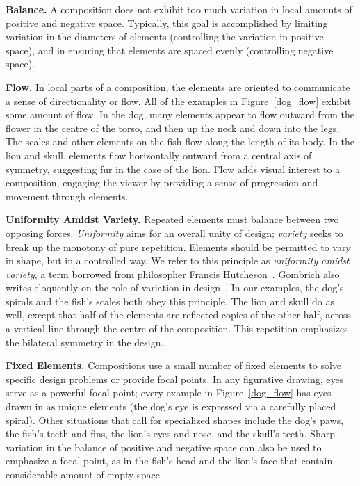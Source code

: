 \begin{items}%
\item \textbf{Balance.} A composition does not exhibit too
  much variation in local amounts of positive and negative space.
  Typically, this goal is accomplished by limiting variation in 
  the diameters of elements (controlling the variation in
  positive space), and in ensuring that elements are spaced 
  evenly (controlling negative space).

\item \textbf{Flow.} In local parts of a composition, the elements
  are oriented to communicate a sense of directionality or flow.
  All of the examples in Figure~\ref{dog_flow} exhibit 
  some amount of flow.  In the dog, many elements appear to flow
  outward from the flower in the centre of the torso, and then
  up the neck and down into the legs.  The scales and other elements
  on the fish flow along the length of its body.  In the lion and skull,
  elements flow horizontally outward from a central axis of symmetry,
  suggesting fur in the case of the lion.  Flow
  adds visual interest to a composition, engaging the viewer 
  by providing a sense of progression and movement through elements.

\item \textbf{Uniformity Amidst Variety.} Repeated elements must balance
  between two opposing forces.  \textit{Uniformity} 
  aims for an overall unity of design; \textit{variety}
  seeks to break up the monotony of
  pure repetition.  Elements should be permitted to vary in shape,
  but in a controlled way.  We refer to this principle
  as \textit{uniformity amidst variety}, a term borrowed from 
  philosopher Francis Hutcheson~\cite{Hutcheson1729}.
  Gombrich also writes eloquently on the role of variation in 
  design~\cite{Gombrich}.
  In our examples, the dog's spirals and the
  fish's scales both obey this principle.  The lion and skull do as well,
  except that half of the elements are reflected copies of the other
  half, across a vertical line through the centre of the composition.
  This repetition emphasizes the bilateral symmetry in the design.

\item \textbf{Fixed Elements.} Compositions use a small number of fixed
  elements to solve specific design problems or provide focal points.
  In any figurative drawing, eyes serve as a powerful focal point;
  every example in Figure~\ref{dog_flow} has eyes drawn
  in as unique elements
  (the dog's eye is expressed via a carefully placed spiral).  Other
  situations that call for specialized shapes include the dog's paws,
  the fish's teeth and fins, 
  the lion's eyes and nose, %
  and the skull's teeth.
  Sharp variation in the balance of positive and negative space
  can also be used to emphasize a focal point,
  as in the fish's head and the lion's face that contain considerable amount of empty space.


\end{items}
